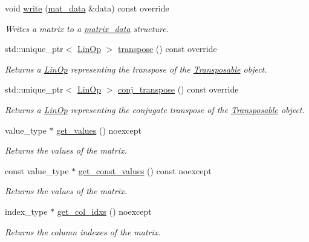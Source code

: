 \begin{DoxyCompactItemize}
void \hyperlink{classgko_1_1matrix_1_1Csr_a205fc391f4cf4f7718a55b0a61f62bc9}{write} (\hyperlink{structgko_1_1matrix__data}{mat\+\_\+data} \&data) const override
\begin{DoxyCompactList}\small\item\em Writes a matrix to a \hyperlink{structgko_1_1matrix__data}{matrix\+\_\+data} structure. \end{DoxyCompactList}\item 
std\+::unique\+\_\+ptr$<$ \hyperlink{classgko_1_1LinOp}{Lin\+Op} $>$ \hyperlink{classgko_1_1matrix_1_1Csr_ab79e609214d6b4834d5961ee0a7d3519}{transpose} () const override
\begin{DoxyCompactList}\small\item\em Returns a \hyperlink{classgko_1_1LinOp}{Lin\+Op} representing the transpose of the \hyperlink{classgko_1_1Transposable}{Transposable} object. \end{DoxyCompactList}\item 
std\+::unique\+\_\+ptr$<$ \hyperlink{classgko_1_1LinOp}{Lin\+Op} $>$ \hyperlink{classgko_1_1matrix_1_1Csr_a38820451af5424f18b767667f3067d72}{conj\+\_\+transpose} () const override
\begin{DoxyCompactList}\small\item\em Returns a \hyperlink{classgko_1_1LinOp}{Lin\+Op} representing the conjugate transpose of the \hyperlink{classgko_1_1Transposable}{Transposable} object. \end{DoxyCompactList}\item 
value\+\_\+type $\ast$ \hyperlink{classgko_1_1matrix_1_1Csr_a929b0a194e6aeb1252b8e6781d162e83}{get\+\_\+values} () noexcept
\begin{DoxyCompactList}\small\item\em Returns the values of the matrix. \end{DoxyCompactList}\item 
const value\+\_\+type $\ast$ \hyperlink{classgko_1_1matrix_1_1Csr_a1801347665214bbefc837b44ba0695ff}{get\+\_\+const\+\_\+values} () const noexcept
\begin{DoxyCompactList}\small\item\em Returns the values of the matrix. \end{DoxyCompactList}\item 
index\+\_\+type $\ast$ \hyperlink{classgko_1_1matrix_1_1Csr_a81c6294177a1be4873804c8a85a9fc64}{get\+\_\+col\+\_\+idxs} () noexcept
\begin{DoxyCompactList}\small\item\em Returns the column indexes of the matrix. \end{DoxyCompactList}\item 

\end{DoxyCompactItemize}
